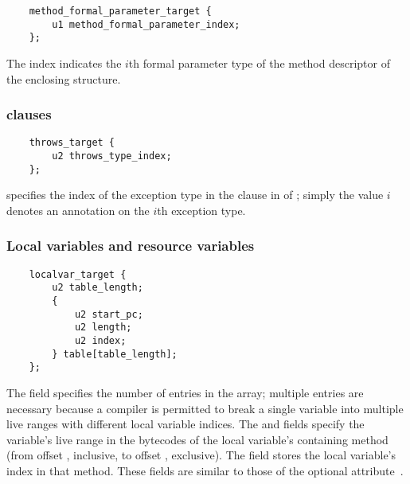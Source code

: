 \documentclass[10pt]{article}
\newcommand{\preverbnegspace}{\vspace{-5pt}}
\begin{document}
\preverbnegspace
\begin{Verbatim}
    method_formal_parameter_target {
        u1 method_formal_parameter_index;
    };
\end{Verbatim}

The index indicates the $i$th formal parameter type of the method
descriptor of the enclosing  structure.



\subsubsection{ clauses\label{class-file:ext:ri:throws}}


\preverbnegspace
\begin{Verbatim}
    throws_target {
        u2 throws_type_index;
    };
\end{Verbatim}

 specifies the index of the exception type in the
clause in  of ;
simply the value $i$ denotes an annotation on the $i$th exception
type.



\subsubsection{Local variables and resource variables\label{class-file:ext:ri:localvar}}


\preverbnegspace
\begin{Verbatim}
    localvar_target {
        u2 table_length;
        {
            u2 start_pc;
            u2 length;
            u2 index;
        } table[table_length];
    };
\end{Verbatim}

The  field specifies the number of entries in the
 array; multiple entries are necessary because a compiler is
permitted to break a single variable into multiple live ranges with different
local variable indices.
The  and  fields specify the variable's
live range in the bytecodes of the local variable's containing method
(from offset , inclusive, to offset , exclusive).  The
 field stores the local variable's index in that method.
These fields are similar to those of the optional
 attribute~\cite[\S 4.8.12]{LindholmYBB2012}.
\end{document}

